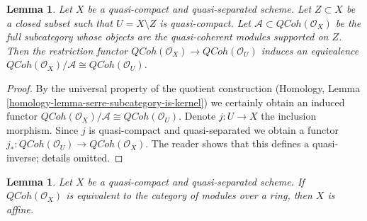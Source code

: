 \documentclass{stacks-project}
\theoremstyle{plain}
\newtheorem{lemma}[subsection]{Lemma}
\theoremstyle{definition}
\theoremstyle{remark}
\numberwithin{equation}{subsection}
\def\QCoh{\mathit{QCoh}}
\begin{document}
\begin{lemma}
\label{lemma-quotient-supported-on-closed}
Let $X$ be a quasi-compact and quasi-separated scheme.
Let $Z \subset X$ be a closed subset such that $U = X \setminus Z$
is quasi-compact. Let $\mathcal{A} \subset \QCoh(\mathcal{O}_X)$
be the full subcategory whose objects are the quasi-coherent modules
supported on $Z$. Then the restriction functor
$\QCoh(\mathcal{O}_X) \to \QCoh(\mathcal{O}_U)$ induces
an equivalence $\QCoh(\mathcal{O}_X)/\mathcal{A} \cong \QCoh(\mathcal{O}_U)$.
\end{lemma}

\begin{proof}
By the universal property of the quotient construction
(Homology, Lemma \ref{homology-lemma-serre-subcategory-is-kernel})
we certainly obtain an induced functor
$\QCoh(\mathcal{O}_X)/\mathcal{A} \cong \QCoh(\mathcal{O}_U)$.
Denote $j : U \to X$ the inclusion morphism. Since $j$ is quasi-compact
and quasi-separated we obtain a functor
$j_* : \QCoh(\mathcal{O}_U) \to \QCoh(\mathcal{O}_X)$.
The reader shows that this defines a quasi-inverse; details omitted.
\end{proof}

\begin{lemma}
\label{lemma-characterize-affine}
Let $X$ be a quasi-compact and quasi-separated scheme.
If $\QCoh(\mathcal{O}_X)$ is equivalent to the category
of modules over a ring, then $X$ is affine.
\end{lemma}
\end{document}
